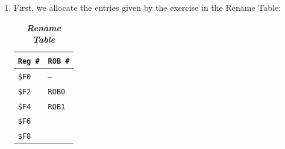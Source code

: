 \highspace
\answer
\begin{enumerate}
    \item First, we allocate the entries given by the exercise in the Rename Table:
    \begin{table}[!htp]
        \centering
        \begin{tabular}{@{} l l @{}}
            \toprule
            \texttt{Reg \#}  & \texttt{ROB \#} \\
            \midrule
            \texttt{\$F0}    & \texttt{--} \\ [.3em]
            \texttt{\$F2}    & \texttt{ROB0} \\ [.3em]
            \texttt{\$F4}    & \texttt{ROB1} \\ [.3em]
            \texttt{\$F6}    & \\ [.3em]
            \texttt{\$F8}    & \\
            \bottomrule
        \end{tabular}
        \caption*{\emph{\textbf{Rename Table}}}
    \end{table}



\end{enumerate}
